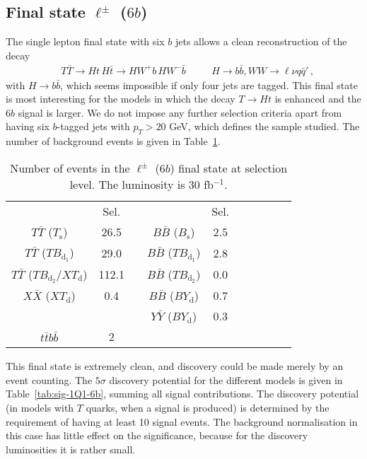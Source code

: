 \documentclass[12pt,a4paper]{article}
\newcommand{\TT}{T \bar T}
\newcommand{\BB}{B \bar B}
\newcommand{\XX}{X \bar X}
\newcommand{\YY}{Y \bar Y}
\newcommand{\Ts}{T_\text{s}}
\newcommand{\Bs}{B_\text{s}}
\newcommand{\TBd}{TB_{\text{d}_1}}
\newcommand{\TBD}{TB_{\text{d}_2}}
\newcommand{\XTd}{XT_\text{d}}
\newcommand{\BYd}{BY_\text{d}}
\begin{document}
\subsection{Final state $\ell^\pm$ ($6b$)}



The single lepton final state with six $b$ jets allows a clean reconstruction of the decay
\begin{align}
& T \bar T \to Ht \, H \bar t \to H W^+b \, H W^- \bar b
&& \quad H \to b \bar b , WW \to \ell \nu q \bar q' \,,
\label{ec:ch1Q16b}
\end{align}
with $H \to b \bar b$, which seems impossible if only four jets are tagged. This final state is most interesting for the models in which the decay $T \to Ht$ is enhanced and the $6b$ signal is larger. We do not impose any further selection criteria apart from having six $b$-tagged jets with $p_T > 20$ GeV, which defines the sample studied. The number of background events is given in Table~\ref{tab:nsnb-1Q1-6b}.
%
\begin{table}[htb]
\begin{center}
\begin{tabular}{cccccccccc}
                 & Sel.  & \quad &        & Sel. \\[1mm]
$\TT$ ($\Ts$)    & 26.5  & & $\BB$ ($\Bs$)  & 2.5 \\
$\TT$ ($\TBd$)   & 29.0  & & $\BB$ ($\TBd$) & 2.8 \\
$\TT$ ($\TBD$/$\XTd$)   & 112.1 & & $\BB$ ($\TBD$) & 0.0 \\
$\XX$ ($\XTd$)   & 0.4   & & $\BB$ ($\BYd$) & 0.7 \\ 
                 &       & & $\YY$ ($\BYd$) & 0.3 \\
\hline
$t\bar tb\bar b$ & 2
\end{tabular}
\end{center}
\caption{Number of events in the $\ell^\pm$ ($6b$) final state at selection level. The luminosity is 30 fb$^{-1}$.}
\label{tab:nsnb-1Q1-6b}
\end{table}
%
This final state is extremely clean, and discovery could be made merely by an event counting. The $5\sigma$ discovery potential for the different models is given in Table~\ref{tab:sig-1Q1-6b}, summing all signal contributions. The discovery potential (in models with $T$ quarks, when a signal is produced) is determined by the requirement of having at least 10 signal events. The background normalisation in this case has little effect on the significance, because for the discovery luminosities it is rather small.
\end{document}
